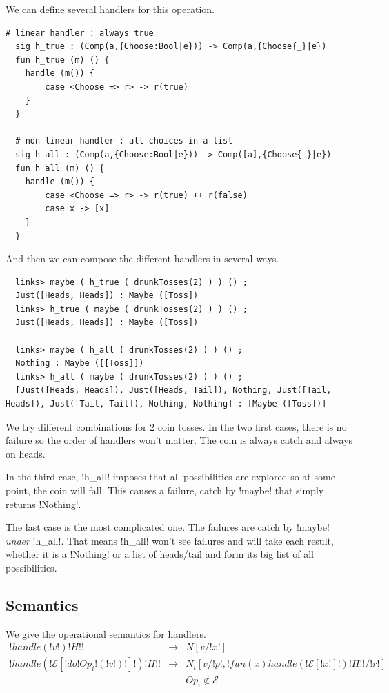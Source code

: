 \documentclass[10pt, nonacm=true, language=french, language=english]{acmart}
\begin{document}
We can define several handlers for this operation.

\begin{lstlisting}[caption=Toss handlers]
  # linear handler : always true
  sig h_true : (Comp(a,{Choose:Bool|e})) -> Comp(a,{Choose{_}|e})
  fun h_true (m) () {
    handle (m()) {
        case <Choose => r> -> r(true)
    }
  }

  # non-linear handler : all choices in a list
  sig h_all : (Comp(a,{Choose:Bool|e})) -> Comp([a],{Choose{_}|e})
  fun h_all (m) () {
    handle (m()) {
        case <Choose => r> -> r(true) ++ r(false)
        case x -> [x]
    }
  }
\end{lstlisting}

And then we can compose the different handlers in several ways.

\begin{lstlisting}
  links> maybe ( h_true ( drunkTosses(2) ) ) () ;
  Just([Heads, Heads]) : Maybe ([Toss])
  links> h_true ( maybe ( drunkTosses(2) ) ) () ;
  Just([Heads, Heads]) : Maybe ([Toss])

  links> maybe ( h_all ( drunkTosses(2) ) ) () ;
  Nothing : Maybe ([[Toss]])
  links> h_all ( maybe ( drunkTosses(2) ) ) () ;
  [Just([Heads, Heads]), Just([Heads, Tail]), Nothing, Just([Tail, Heads]), Just([Tail, Tail]), Nothing, Nothing] : [Maybe ([Toss])]
\end{lstlisting}

We try different combinations for 2 coin tosses. In the two first cases, there is no failure so the order of handlers won't matter. The coin is always catch and always on heads.

In the third case, !h_all! imposes that all possibilities are explored so at some point, the coin will fall. This causes a failure, catch by !maybe! that simply returns !Nothing!.

The last case is the most complicated one. The failures are catch by !maybe! \emph{under} !h_all!. That means !h_all! won't see failures and will take each result, whether it is a !Nothing! or a list of heads/tail and form its big list of all possibilities.


\subsection{Semantics}
\label{sec:semantics}

We give the operational semantics for handlers.
\[
  \begin{array}{rcl}
    !handle ( !v! ) { !H! }! & \longrightarrow & N[v/!x!] \\
    !handle ( !\mathcal E[!do !Op_{i}!( !v! )!]! ) { !H! }! & \longrightarrow & N_{i}[v/!p!, !fun (x)  { handle ( !\mathcal E[!x!] ! ) { !H! } }!/!r!] \\
                                                                             && Op_{i} \notin \mathcal E\\
  \end{array}
\]
\end{document}
